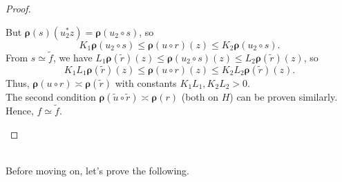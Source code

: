 \documentclass[a4paper,10pt]{article}
\theoremstyle{plain}
\theoremstyle{definition}
\theoremstyle{remark}
\begin{document}
\begin{proof}
\begin{itemize}
\begin{itemize}
                  But $\boldsymbol{\rho}(s)(u_2^* z) = \boldsymbol{\rho}(u_2 \circ s)$, so
                  \[ K_1 \boldsymbol{\rho}(u_2 \circ s) \leq\boldsymbol{\rho}(u\circ r)(z)\leq K_2 \boldsymbol{\rho}(u_2 \circ s). \]
                  From $s\simeq\tilde{f}$, we have
                  $L_1\boldsymbol{\rho}(\tilde{r})(z)\leq\boldsymbol{\rho}(u_2\circ s)(z)\leq L_2\boldsymbol{\rho}(\tilde{r})(z)$, so
                  \[
                    K_1L_1\boldsymbol{\rho}(\tilde{r})(z)\leq\boldsymbol{\rho}(u\circ r)(z)\leq K_2L_2\boldsymbol{\rho}(\tilde{r})(z).
                  \]
                  Thus, $\boldsymbol{\rho}(u\circ r)\asymp\boldsymbol{\rho}(\tilde{r})$ with constants $K_1L_1,K_2L_2>0$. \\
                  The second condition $\boldsymbol{\rho}(\tilde{u}\circ\tilde{r})\asymp\boldsymbol{\rho}(r)$ (both on $H$) can be proven similarly. \\
                  Hence, $f\simeq\tilde{f}$.
          \end{itemize}
  \end{itemize}
\end{proof}

\mbox{} \\
Before moving on, let's prove the following.
\end{document}
